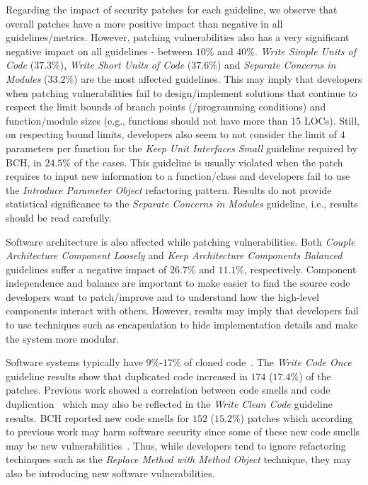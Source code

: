 \documentclass[10pt,conference]{IEEEtran}
\begin{document}
Regarding the impact of security patches for each guideline, we observe
that overall patches have a more positive impact than negative in
all guidelines/metrics. However, patching vulnerabilities also has a very
significant negative impact on all guidelines - between $10\%$ and $40\%$. 
\emph{Write Simple Units of Code} ($37.3\%$), \emph{Write Short Units of 
Code} ($37.6\%$) and \emph{Separate Concerns in Modules} ($33.2\%$) are the 
most affected guidelines. This may imply that developers when patching 
vulnerabilities fail to design/implement solutions that continue to respect 
the limit bounds of branch points (/programming conditions) and function/module 
sizes (e.g., functions should not have more than $15$ LOCs). Still, on 
respecting bound limits, developers also seem to not consider the limit 
of $4$ parameters per function for the \emph{Keep Unit Interfaces Small} 
guideline required by BCH, in $24.5\%$ of the cases. This guideline is usually
violated when the patch requires to input new information to a function/class 
and developers fail to use the \emph{Introduce Parameter Object} refactoring 
pattern. Results do not provide statistical significance to the \emph{Separate 
Concerns in Modules} guideline, i.e., results should be read carefully. 

Software architecture is also affected while patching vulnerabilities.
Both \emph{Couple Architecture Component Loosely} and \emph{Keep
Architecture Components Balanced} guidelines suffer a negative impact of 
$26.7\%$ and $11.1\%$, respectively. Component independence and balance
are important to make easier to find the source code developers
want to patch/improve and to understand how the high-level components
interact with others. However, results may imply that developers
fail to use techniques such as encapsulation to hide implementation
details and make the system more modular.

Software systems typically have $9\%$-$17\%$ of cloned code~\cite{5773403}. 
The \emph{Write Code Once} guideline results show that duplicated code 
increased in $174$ ($17.4\%$) of the patches. Previous work showed a 
correlation between code smells and code duplication~\cite{7476787} 
which may also be reflected in the \emph{Write Clean Code} guideline results. 
BCH reported new code smells for $152$ ($15.2\%$) patches which according 
to previous work may harm software security since some of these new code
smells may be new vulnerabilities~\cite{8819456}. Thus, while developers 
tend to ignore refactoring techinques such as the \emph{Replace Method 
with Method Object} technique, they may also be introducing new software 
vulnerabilities. 
  
\end{document}
